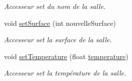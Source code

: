 \begin{DoxyCompactItemize}
\begin{DoxyCompactList}\small\item\em Accesseur set du nom de la salle. \end{DoxyCompactList}\item 
void \hyperlink{classcom_1_1lasalle_1_1meeting_1_1_salle_ac95af260fcfd0ad267de052cdc0dbeae}{set\+Surface} (int nouvelle\+Surface)
\begin{DoxyCompactList}\small\item\em Accesseur set la surface de la salle. \end{DoxyCompactList}\item 
void \hyperlink{classcom_1_1lasalle_1_1meeting_1_1_salle_ae618bd9da7fd68e4789b3d87a4aa90b3}{set\+Temperature} (float \hyperlink{classcom_1_1lasalle_1_1meeting_1_1_salle_a31600559f77e2eeb1f6aa150b203213e}{temperature})
\begin{DoxyCompactList}\small\item\em Accesseur set la température de la salle. \end{DoxyCompactList}\end{DoxyCompactItemize}
